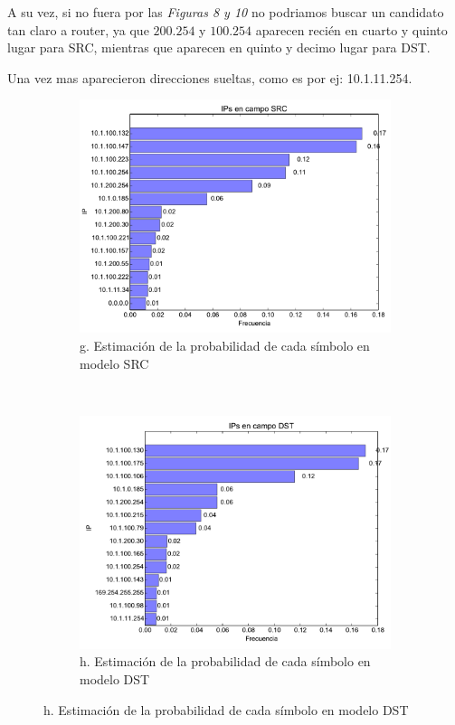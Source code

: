 A su vez, si no fuera por las \emph{Figuras 8 y 10} no podriamos buscar un
candidato tan claro a router, ya que $200.254$ y $100.254$ aparecen reci\'en
en cuarto y quinto lugar para SRC, mientras que aparecen en quinto y decimo 
lugar para DST.

Una vez mas aparecieron direcciones sueltas, como es por ej: 10.1.11.254.

\begin{figure}[H]
	\center
	\begin{subfigure}{0.43\textwidth}
		\includegraphics[width=1.0\textwidth]{resultados/entrepiso/ipsSrc_4_25991830161.pdf}
		\caption{g. Estimaci\'on de la probabilidad de cada s\'imbolo en modelo SRC}
	\end{subfigure}
	~
	\begin{subfigure}{0.43\textwidth}
		\includegraphics[width=1.0\textwidth]{resultados/entrepiso/ipsDst_4_90633854055.pdf}
		\caption{h. Estimaci\'on de la probabilidad de cada s\'imbolo en modelo DST}
	\end{subfigure}
\end{figure}

